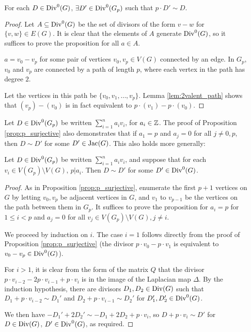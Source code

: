 \documentclass{amsart}
\begin{document}
\begin{prop}
  \label{prop:p_surjective}
  For each $D \in \operatorname{Div}^0(G)$, $\exists D' \in \operatorname{Div}^0(G_p)$ such that $p
  \cdot D' \sim D$.
\end{prop}
\begin{proof}
  Let $A \subseteq \operatorname{Div}^0(G)$ be the set of divisors of the form $v -
  w$ for $\{v, w\} \in E(G)$. It is clear that the elements of $A$
  generate $\operatorname{Div}^0(G)$, so it suffices to prove the proposition for
  all $a \in A$.
  
  $a = v_0 - v_p$ for some pair of vertices $v_0, v_p \in V(G)$
  connected by an edge. In $G_p$, $v_0$ and $v_p$ are connected by a
  path of length $p$, where each vertex in the path has degree $2$.
  
  Let the vertices in this path be $\{v_0, v_1, \ldots, v_p\}$. Lemma
  \ref{lem:2valent_path} shows that $(v_p) - (v_0)$ is in fact
  equivalent to $p \cdot (v_1) - p \cdot (v_0)$.
\end{proof}

Let $D \in \operatorname{Div}^0(G_p)$ be written $\sum_{i=1}^na_iv_i$, for $a_i \in
\mathbb{Z}$. The proof of Proposition \ref{prop:p_surjective} also
demonstrates that if $a_1 = p$ and $a_j = 0$ for all $j \ne 0, p$,
then $D \sim D'$ for some $D' \in \operatorname{Jac}(G)$. This also holds more
generally:

\begin{prop}
  \label{prop:p_to_jac}
  Let $D \in \operatorname{Div}^0(G_p)$ be written $\sum_{i=1}^na_iv_i$, and
  suppose that for each $v_i \in V(G_p) \setminus V(G)$, $p |
  a_i$. Then $D \sim D'$ for some $D' \in \operatorname{Div}^0(G)$. 
\end{prop}
\begin{proof}
  As in Proposition \ref{prop:p_surjective}, enumerate the first $p+1$
  vertices on $G$ by letting $v_0, v_p$ be adjacent vertices in $G$,
  and $v_1$ to $v_{p-1}$ be the vertices on the path between them in
  $G_p$. It suffices to prove the proposition for $a_i = p$ for $1 \le
  i < p$ and $a_j = 0$ for all $v_j \in V(G_p) \setminus V(G), j \ne
  i$.

  We proceed by induction on $i$. The case $i=1$ follows directly from
  the proof of Proposition \ref{prop:p_surjective} (the divisor $p
  \cdot v_0 - p \cdot v_1$ is equivalent to $v_0 - v_p \in
  \operatorname{Div}^0(G)$).

  For $i > 1$, it is clear from the form of the matrix $Q$ that the
  divisor $p \cdot v_{i-2} - 2p \cdot v_{i-1} + p \cdot v_i$ is in
  the image of the Laplacian map $\Delta$. By the induction
  hypothesis, there are divisors $D_1, D_2 \in \operatorname{Div}(G)$ such that
  $D_1 + p \cdot v_{i-2} \sim D_1'$ and $D_2 + p \cdot v_{i-1} \sim
  D_2'$ for $D_1', D_2' \in \operatorname{Div}^0(G)$. 

  We then have $-D_1' + 2D_2' \sim -D_1 + 2D_2 + p \cdot v_i$, so
  $D + p \cdot v_i \sim D'$ for $D \in \operatorname{Div}(G)$, $D' \in \operatorname{Div}^0(G)$,
  as required.
\end{proof}
\end{document}
